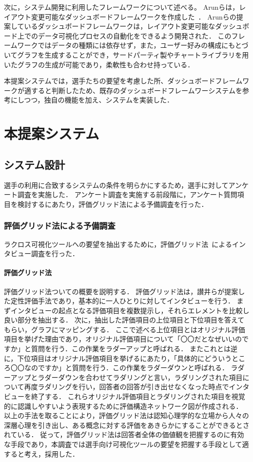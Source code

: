 \documentclass[sotsuron]{kuee}
\begin{document}
	次に，システム開発に利用したフレームワークについて述べる。	
	Arunらは，レイアウト変更可能なダッシュボードフレームワークを作成した~\cite{dashboard}．
	Arunらの提案しているダッシュボードフレームワークは，レイアウト変更可能なダッシュボード上でのデータ可視化プロセスの自動化をできるよう開発された．
	このフレームワークではデータの種類には依存せず，また，ユーザー好みの構成にもとづいてグラフを生成することができ，サードパーティ製やチャートライブラリを用いたグラフの生成が可能であり，柔軟性も合わせ持っている．
	
	本提案システムでは，選手たちの要望を考慮した所、ダッシュボードフレームワークが適すると判断したため、既存のダッシュボードフレームワーシステムを参考にしつつ，独自の機能を加え、システムを実装した．

\chapter{本提案システム}
	\section{システム設計}
		選手の利用に合致するシステムの条件を明らかにするため，選手に対してアンケート調査を実施した．
		アンケート調査を実施する前段階に，アンケート質問項目を検討するにあたり，評価グリッド法による予備調査を行った．
		\subsection{評価グリッド法による予備調査}
			ラクロス可視化ツールへの要望を抽出するために，評価グリッド法~\cite{EGM}によるインタビュー調査を行った．
			\subsubsection{評価グリッド法}
				評価グリッド法ついての概要を説明する．
				評価グリッド法は，讃井らが提案した定性評価手法であり，基本的に一人ひとりに対してインタビューを行う．
				まずインタビューの起点となる評価項目を複数提示し，それらエレメントを比較し良い部分を抽出する．
				次に，抽出した評価項目の上位項目と下位項目を答えてもらい，グラフにマッピングする．
				ここで述べる上位項目とはオリジナル評価項目を挙げた理由であり，オリジナル評価項目について「〇〇だとなぜいいのですか」と質問を行う．この作業をラダーアップと呼ばれる．
				またこれとは逆に，下位項目はオリジナル評価項目を挙げるにあたり，「具体的にどういうところ〇〇なのですか」と質問を行う．この作業をラダーダウンと呼ばれる．
				ラダーアップとラダーダウンを合わせてラダリングと言い，ラダリングされた項目について再度ラダリングを行い，回答者の回答が引き出せなくなった時点でインタビューを終了する．
				これらオリジナル評価項目とラダリングされた項目を視覚的に認識しやすいよう表現するために評価構造ネットワーク図が作成される．
				以上の手法を取ることにより，評価グリッド法は認知心理学的な立場から人々の深層心理を引き出し、ある概念に対する評価をあきらかにすることができるとされている．
				従って，評価グリッド法は回答者全体の価値観を把握するのに有効な手段であり，本調査では選手向け可視化ツールの要望を把握する手段として適すると考え，採用した．
\end{document}
